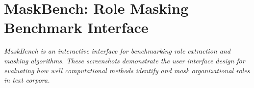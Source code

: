\documentclass[../main.tex]{subfiles}
\begin{document}
\chapter{MaskBench: Role Masking Benchmark Interface}

\begin{fullwidthpar}
\textit{MaskBench is an interactive interface for benchmarking role extraction and masking algorithms. These screenshots demonstrate the user interface design for evaluating how well computational methods identify and mask organizational roles in text corpora.}
\end{fullwidthpar}

\vspace{1cm}










\end{document}
